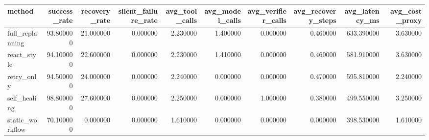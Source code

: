 \begin{tabular}{lrrrrrrrrr}
\toprule
method & success_rate & recovery_rate & silent_failure_rate & avg_tool_calls & avg_model_calls & avg_verifier_calls & avg_recovery_steps & avg_latency_ms & avg_cost_proxy \\
\midrule
full_replanning & 93.800000 & 21.000000 & 0.000000 & 2.230000 & 1.400000 & 0.000000 & 0.460000 & 633.390000 & 3.630000 \\
react_style & 94.100000 & 22.600000 & 0.000000 & 2.230000 & 1.410000 & 0.000000 & 0.460000 & 581.910000 & 3.630000 \\
retry_only & 94.500000 & 24.000000 & 0.000000 & 2.240000 & 0.000000 & 0.000000 & 0.470000 & 595.810000 & 2.240000 \\
self_healing & 98.800000 & 27.600000 & 0.000000 & 2.250000 & 0.000000 & 1.000000 & 0.380000 & 499.550000 & 3.250000 \\
static_workflow & 70.100000 & 0.000000 & 0.000000 & 1.610000 & 0.000000 & 0.000000 & 0.000000 & 398.530000 & 1.610000 \\
\bottomrule
\end{tabular}
